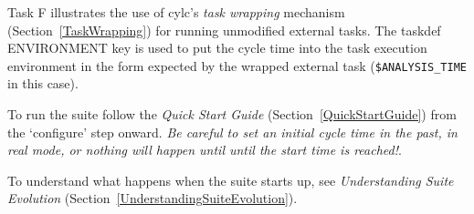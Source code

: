 Task F illustrates the use of cylc's {\em task wrapping} mechanism
(Section~\ref{TaskWrapping}) for running unmodified external tasks. 
The taskdef ENVIRONMENT key is used to put the cycle time
into the task execution environment in the form expected by the wrapped
external task (\lstinline=$ANALYSIS_TIME= in this case). 

To run the suite follow the {\em Quick Start Guide}
(Section~\ref{QuickStartGuide}) from the `configure' step onward. 
{\em Be careful to set an initial cycle time in the past, in real mode,
or nothing will happen until until the start time is reached!}.

To understand what happens when the suite starts up, see {\em
Understanding Suite Evolution}
(Section~\ref{UnderstandingSuiteEvolution}).
